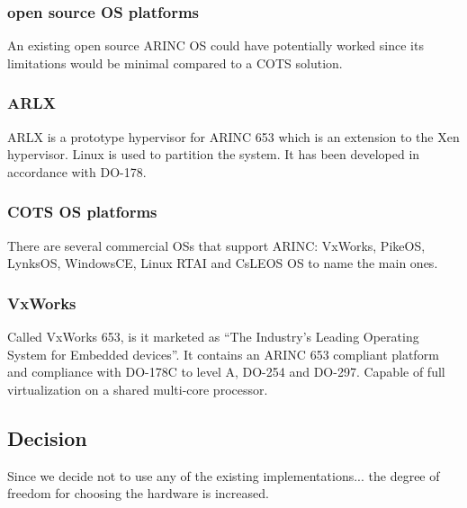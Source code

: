 \subsubsection{open source OS platforms}
An existing open source ARINC OS could have potentially worked since its limitations would be minimal
compared to a COTS solution. %

\subsubsection{ARLX}
ARLX is a prototype hypervisor for ARINC 653 which is an extension to the Xen hypervisor.
Linux is used to partition the system.
It has been developed in accordance with DO-178.

\subsubsection{COTS OS platforms}
There are several commercial OSs that support ARINC:
VxWorks, PikeOS, LynksOS, WindowsCE, Linux RTAI and CsLEOS OS to name the main ones.

\subsubsection{VxWorks}
Called VxWorks 653, is it marketed as ``The Industry's Leading Operating System for Embedded devices''.
It contains an ARINC 653 compliant platform and compliance with DO-178C to level A, DO-254 and DO-297.
Capable of full virtualization on a shared multi-core processor.

\subsection{Decision}
Since we decide not to use any of the existing implementations...
the degree of freedom for choosing the hardware is increased.

